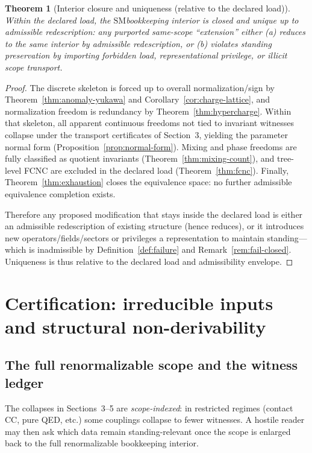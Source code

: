 \documentclass[11pt]{article}
\newtheorem{theorem}[definition]{Theorem}
\theoremstyle{remark}
\newcommand{\SM}{\ensuremath{\mathrm{SM}}}
\begin{document}
\begin{theorem}[Interior closure and uniqueness (relative to the declared load)]\label{thm:closure}
Within the declared load, the \SM bookkeeping interior is closed and unique up to admissible redescription:
any purported same-scope ``extension'' either (a) reduces to the same interior by admissible redescription,
or (b) violates standing preservation by importing forbidden load, representational privilege, or illicit
scope transport.
\end{theorem}

\begin{proof}
The discrete skeleton is forced up to overall normalization/sign by Theorem~\ref{thm:anomaly-yukawa} and
Corollary~\ref{cor:charge-lattice}, and normalization freedom is redundancy by Theorem~\ref{thm:hypercharge}.
Within that skeleton, all apparent continuous freedoms not tied to invariant witnesses collapse under the
transport certificates of Section~3, yielding the parameter normal form (Proposition~\ref{prop:normal-form}).
Mixing and phase freedoms are fully classified as quotient invariants (Theorem~\ref{thm:mixing-count}),
and tree-level FCNC are excluded in the declared load (Theorem~\ref{thm:fcnc}).
Finally, Theorem~\ref{thm:exhaustion} closes the equivalence space: no further admissible equivalence
completion exists.

Therefore any proposed modification that stays inside the declared load is either an admissible redescription
of existing structure (hence reduces), or it introduces new operators/fields/sectors or privileges a
representation to maintain standing---which is inadmissible by Definition~\ref{def:failure} and
Remark~\ref{rem:fail-closed}. Uniqueness is thus relative to the declared load and admissibility envelope.
\end{proof}

\section{Certification: irreducible inputs and structural non-derivability}\label{sec:certification}

\subsection{The full renormalizable scope and the witness ledger}

The collapses in Sections~3--5 are \emph{scope-indexed}: in restricted regimes (contact CC, pure QED, etc.)
some couplings collapse to fewer witnesses. A hostile reader may then ask which data remain standing-relevant
once the scope is enlarged back to the full renormalizable bookkeeping interior.
\end{document}

